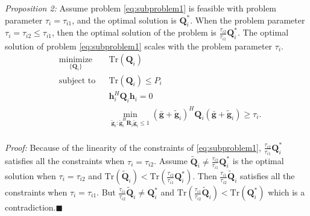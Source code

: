 \documentclass[conference]{IEEEtran}
\begin{document}
\emph{Proposition 2:} Assume problem \eqref{eq:subproblem1} is feasible with problem parameter $\tau_i = \tau_{i1}$, and the optimal solution is $\mathbf{Q}_i^*$. When the problem parameter $\tau_i = \tau_{i2} \leq \tau_{i1}$, then the optimal solution of the problem is $\frac{\tau_{i2}}{\tau_{i1}}\mathbf{Q}_i^*$. The optimal solution of problem \eqref{eq:subproblem1} scales with the problem parameter $\tau_i$.
\begin{equation}
\begin{aligned} \label{eq:subproblem1}
& \underset{\{\mathbf{Q}_i\}}{\text{minimize}}
& & \mathrm{Tr}(\mathbf{Q}_i) \\
& \text{subject to}
& & \mathrm{Tr}(\mathbf{Q}_i) \leq P_i\\
&&& \mathbf{h}_i^H \mathbf{Q}_i \mathbf{h}_i= 0\\
&&& \min_{\tilde{\mathbf{g}}_i: \tilde{\mathbf{g}}_i^H \mathbf{R}_i\tilde{\mathbf{g}}_i \leq 1}(\bar{\mathbf{g}}+\tilde{\mathbf{g}}_i)^H\mathbf{Q}_i(\bar{\mathbf{g}}+\tilde{\mathbf{g}}_i) \geq  \tau_{i}.\\
\end{aligned}
\end{equation}

\emph{Proof:} Because of the linearity of the constraints of \eqref{eq:subproblem1},  $\frac{\tau_{i2}}{\tau_{i1}}\mathbf{Q}_i^*$ satisfies all the constraints when $\tau_i = \tau_{i2}$. Assume $\tilde{\mathbf{Q}}_i \neq \frac{\tau_{i2}}{\tau_{i1}}\mathbf{Q}_i^*$ is the optimal solution when $\tau_i = \tau_{i2}$ and $\mathrm{Tr}(\tilde{\mathbf{Q}}_i) < \mathrm{Tr}(\frac{\tau_{i2}}{\tau_{i1}}\mathbf{Q}_i^*)$. Then $\frac{\tau_{i1}}{\tau_{i2}}\tilde{\mathbf{Q}}_i$ satisfies all the constraints when $\tau_i = \tau_{i1}$. But $\frac{\tau_{i1}}{\tau_{i2}}\tilde{\mathbf{Q}}_i \neq \mathbf{Q}_i^*$ and $\mathrm{Tr}(\frac{\tau_{i1}}{\tau_{i2}}\tilde{\mathbf{Q}}_i) < \mathrm{Tr}(\mathbf{Q}_i^*)$ which is a contradiction.$\blacksquare$
\end{document}
